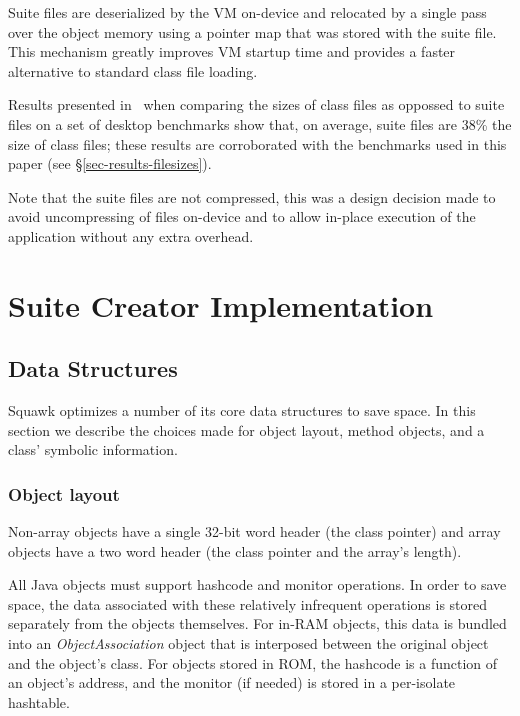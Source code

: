 \documentclass{sigplanconf}
\begin{document}
Suite files are deserialized by the VM on-device and relocated 
by a single pass over the object memory using a pointer map that
was stored with the suite file.  This mechanism greatly improves
VM startup time and provides a faster alternative to standard 
class file loading. 


Results presented in~\cite{Shay03} when comparing the sizes of class files
as oppossed to suite files on a set of desktop benchmarks show that,
on average, suite files are 38\% the size of class files; these results 
are corroborated with the benchmarks used in this paper (see \S\ref{sec-results-filesizes}).

Note that the suite files are not compressed, this was a design 
decision made to avoid uncompressing of files on-device and to allow
in-place execution of the application without any extra overhead. 


\section{Suite Creator Implementation}
\label{sec-translator}


\subsection{Data Structures}

Squawk optimizes a number of its core data structures to save space.
In this section we describe the choices made for object layout, 
method objects, and a class' symbolic information.

\subsubsection*{Object layout}
Non-array objects have a single 32-bit word header (the class pointer) 
and array objects have a two word header (the class pointer and 
the array's length). 

All Java objects must support hashcode and monitor operations. In order 
to save space, the data associated with these relatively infrequent 
operations
is stored separately from the objects themselves. For in-RAM objects, 
this data is bundled into an {\em ObjectAssociation} object that is 
interposed between the original object and the object's class. For 
objects stored in ROM, the hashcode is a function of an object's 
address, and the monitor (if needed) is stored in a per-isolate hashtable.
\end{document}
